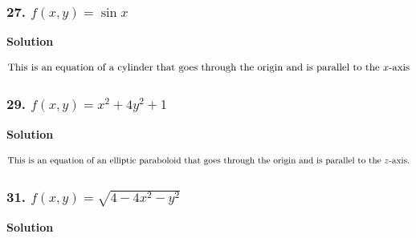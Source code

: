 \documentclass{article}
\begin{document}
\subsubsection*{27. $f(x,y) = \sin x$}
\centerline{\textbf{Solution}}
\begin{align*}
    \intertext{This is an equation of a cylinder that goes through the origin and is parallel to the $x$-axis}
\end{align*}
\subsubsection*{29. $f(x,y) = x^2 + 4y^2 + 1$}
\centerline{\textbf{Solution}}
\begin{align*}
    \intertext{This is an equation of an elliptic paraboloid that goes through the origin and is parallel to the $z$-axis.}
\end{align*}
\subsubsection*{31. $f(x,y) = \sqrt{4 - 4x^2 - y^2}$}
\centerline{\textbf{Solution}}
\begin{align*}
\end{align*}
\end{document}
